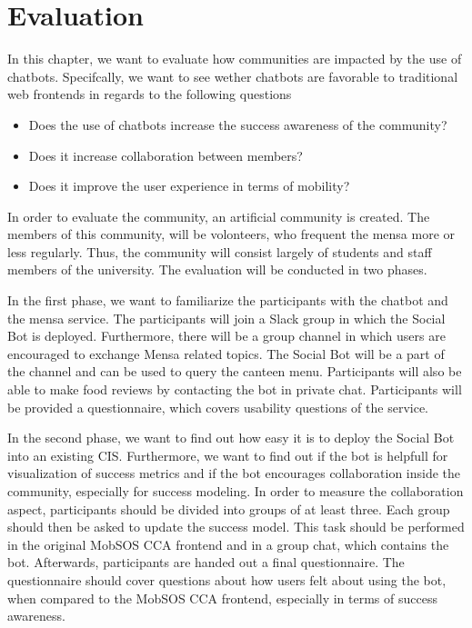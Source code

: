\chapter{Evaluation}
In this chapter, we want to evaluate how communities are impacted by the use of chatbots. Specifcally, we want to see wether chatbots are favorable to traditional web frontends in regards to the following questions
\begin{itemize}
    \item Does the use of chatbots increase the success awareness of the community?
    \item Does it increase collaboration between members?
    \item Does it improve the user experience in terms of mobility?
\end{itemize}

In order to evaluate the community, an artificial community is created. The members of this community, will be volonteers, who frequent the mensa more or less regularly. Thus, the community will consist largely of students and staff members of the university. The evaluation will be conducted in two phases.

In the first phase, we want to familiarize the participants with the chatbot and the mensa service. The participants will join a Slack group in which the Social Bot is deployed. Furthermore, there will be a group channel in which users are encouraged to exchange Mensa related topics. The Social Bot will be a part of the channel and can be used to query the canteen menu. Participants will also be able to make food reviews by contacting the bot in private chat. Participants will be provided a questionnaire, which covers usability questions of the service.

In the second phase, we want to find out how easy it is to deploy the Social Bot into an existing CIS. Furthermore, we want to find out if the bot is helpfull for visualization of success metrics and if the bot encourages collaboration inside the community, especially for success modeling. In order to measure the collaboration aspect, participants should be divided into groups of at least three. Each group should then be asked to update the success model. This task should be performed in the original MobSOS CCA frontend and in a group chat, which contains the bot.
Afterwards, participants are handed out a final questionnaire. The questionnaire should cover questions about how users felt about using the bot, when compared to the MobSOS CCA frontend, especially in terms of success awareness.


